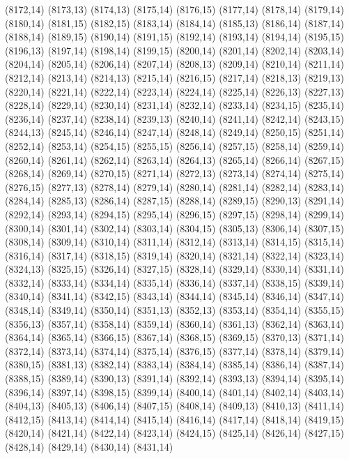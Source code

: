 (8172,14)
(8173,13)
(8174,13)
(8175,14)
(8176,15)
(8177,14)
(8178,14)
(8179,14)
(8180,14)
(8181,15)
(8182,15)
(8183,14)
(8184,14)
(8185,13)
(8186,14)
(8187,14)
(8188,14)
(8189,15)
(8190,14)
(8191,15)
(8192,14)
(8193,14)
(8194,14)
(8195,15)
(8196,13)
(8197,14)
(8198,14)
(8199,15)
(8200,14)
(8201,14)
(8202,14)
(8203,14)
(8204,14)
(8205,14)
(8206,14)
(8207,14)
(8208,13)
(8209,14)
(8210,14)
(8211,14)
(8212,14)
(8213,14)
(8214,13)
(8215,14)
(8216,15)
(8217,14)
(8218,13)
(8219,13)
(8220,14)
(8221,14)
(8222,14)
(8223,14)
(8224,14)
(8225,14)
(8226,13)
(8227,13)
(8228,14)
(8229,14)
(8230,14)
(8231,14)
(8232,14)
(8233,14)
(8234,15)
(8235,14)
(8236,14)
(8237,14)
(8238,14)
(8239,13)
(8240,14)
(8241,14)
(8242,14)
(8243,15)
(8244,13)
(8245,14)
(8246,14)
(8247,14)
(8248,14)
(8249,14)
(8250,15)
(8251,14)
(8252,14)
(8253,14)
(8254,15)
(8255,15)
(8256,14)
(8257,15)
(8258,14)
(8259,14)
(8260,14)
(8261,14)
(8262,14)
(8263,14)
(8264,13)
(8265,14)
(8266,14)
(8267,15)
(8268,14)
(8269,14)
(8270,15)
(8271,14)
(8272,13)
(8273,14)
(8274,14)
(8275,14)
(8276,15)
(8277,13)
(8278,14)
(8279,14)
(8280,14)
(8281,14)
(8282,14)
(8283,14)
(8284,14)
(8285,13)
(8286,14)
(8287,15)
(8288,14)
(8289,15)
(8290,13)
(8291,14)
(8292,14)
(8293,14)
(8294,15)
(8295,14)
(8296,15)
(8297,15)
(8298,14)
(8299,14)
(8300,14)
(8301,14)
(8302,14)
(8303,14)
(8304,15)
(8305,13)
(8306,14)
(8307,15)
(8308,14)
(8309,14)
(8310,14)
(8311,14)
(8312,14)
(8313,14)
(8314,15)
(8315,14)
(8316,14)
(8317,14)
(8318,15)
(8319,14)
(8320,14)
(8321,14)
(8322,14)
(8323,14)
(8324,13)
(8325,15)
(8326,14)
(8327,15)
(8328,14)
(8329,14)
(8330,14)
(8331,14)
(8332,14)
(8333,14)
(8334,14)
(8335,14)
(8336,14)
(8337,14)
(8338,15)
(8339,14)
(8340,14)
(8341,14)
(8342,15)
(8343,14)
(8344,14)
(8345,14)
(8346,14)
(8347,14)
(8348,14)
(8349,14)
(8350,14)
(8351,13)
(8352,13)
(8353,14)
(8354,14)
(8355,15)
(8356,13)
(8357,14)
(8358,14)
(8359,14)
(8360,14)
(8361,13)
(8362,14)
(8363,14)
(8364,14)
(8365,14)
(8366,15)
(8367,14)
(8368,15)
(8369,15)
(8370,13)
(8371,14)
(8372,14)
(8373,14)
(8374,14)
(8375,14)
(8376,15)
(8377,14)
(8378,14)
(8379,14)
(8380,15)
(8381,13)
(8382,14)
(8383,14)
(8384,14)
(8385,14)
(8386,14)
(8387,14)
(8388,15)
(8389,14)
(8390,13)
(8391,14)
(8392,14)
(8393,13)
(8394,14)
(8395,14)
(8396,14)
(8397,14)
(8398,15)
(8399,14)
(8400,14)
(8401,14)
(8402,14)
(8403,14)
(8404,13)
(8405,13)
(8406,14)
(8407,15)
(8408,14)
(8409,13)
(8410,13)
(8411,14)
(8412,15)
(8413,14)
(8414,14)
(8415,14)
(8416,14)
(8417,14)
(8418,14)
(8419,15)
(8420,14)
(8421,14)
(8422,14)
(8423,14)
(8424,15)
(8425,14)
(8426,14)
(8427,15)
(8428,14)
(8429,14)
(8430,14)
(8431,14)
